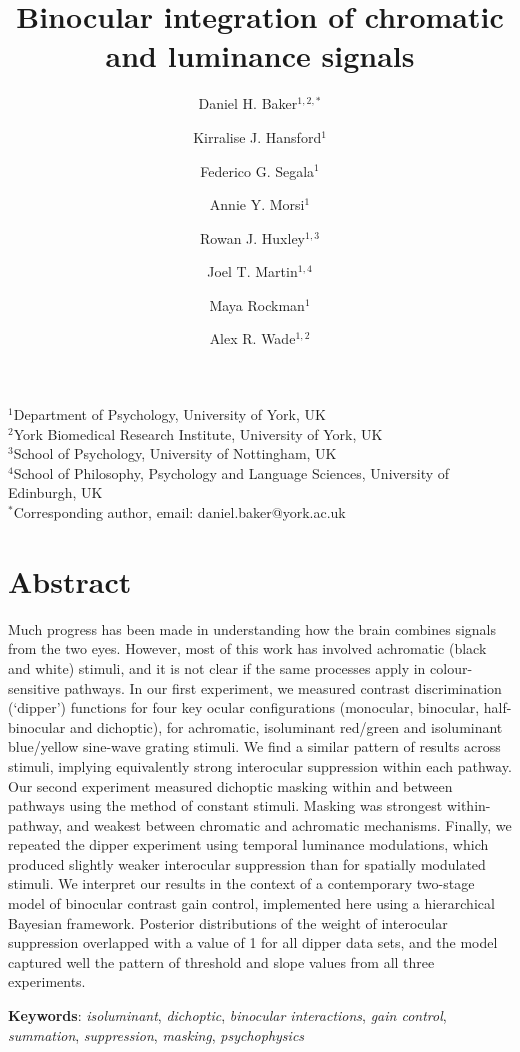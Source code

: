 \documentclass[
  letterpaper,
  DIV=11,
  numbers=noendperiod]{scrartcl}
\title{Binocular integration of chromatic and luminance signals}
\author{Daniel H. Baker\(^{1,2,*}\) \and Kirralise J.
Hansford\(^1\) \and Federico G. Segala\(^1\) \and Annie Y.
Morsi\(^1\) \and Rowan J. Huxley\(^{1,3}\) \and Joel T.
Martin\(^{1,4}\) \and Maya Rockman\(^1\) \and Alex R. Wade\(^{1,2}\)}
\date{}
\begin{document}
\maketitle
\(^1\)Department of Psychology, University of York, UK\\
\(^2\)York Biomedical Research Institute, University of York, UK\\
\(^3\)School of Psychology, University of Nottingham, UK\\
\(^4\)School of Philosophy, Psychology and Language Sciences, University
of Edinburgh, UK\\
\(^*\)Corresponding author, email: daniel.baker@york.ac.uk

\hypertarget{abstract}{%
\section{Abstract}\label{abstract}}

Much progress has been made in understanding how the brain combines
signals from the two eyes. However, most of this work has involved
achromatic (black and white) stimuli, and it is not clear if the same
processes apply in colour-sensitive pathways. In our first experiment,
we measured contrast discrimination (`dipper') functions for four key
ocular configurations (monocular, binocular, half-binocular and
dichoptic), for achromatic, isoluminant red/green and isoluminant
blue/yellow sine-wave grating stimuli. We find a similar pattern of
results across stimuli, implying equivalently strong interocular
suppression within each pathway. Our second experiment measured
dichoptic masking within and between pathways using the method of
constant stimuli. Masking was strongest within-pathway, and weakest
between chromatic and achromatic mechanisms. Finally, we repeated the
dipper experiment using temporal luminance modulations, which produced
slightly weaker interocular suppression than for spatially modulated
stimuli. We interpret our results in the context of a contemporary
two-stage model of binocular contrast gain control, implemented here
using a hierarchical Bayesian framework. Posterior distributions of the
weight of interocular suppression overlapped with a value of 1 for all
dipper data sets, and the model captured well the pattern of threshold
and slope values from all three experiments.

\textbf{Keywords}: \emph{isoluminant}, \emph{dichoptic}, \emph{binocular
interactions}, \emph{gain control}, \emph{summation},
\emph{suppression}, \emph{masking}, \emph{psychophysics}
\end{document}
